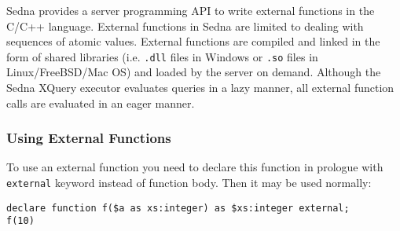 \documentclass[a4paper,12pt]{article}
\begin{document}
Sedna provides a server programming API to write external
functions in the C/C++ language.
External functions in Sedna are limited to dealing with sequences of atomic values.
External functions are compiled and linked in the form of shared
libraries (i.e. \verb!.dll! files in Windows or \verb!.so! files in Linux/FreeBSD/Mac OS)
and loaded by the server on demand.
Although the Sedna XQuery executor evaluates queries in a lazy manner, all external function calls are evaluated in an eager manner.

\subsubsection*{Using External Functions}
To use an external function you need to declare this function in prologue
with \verb!external! keyword instead of function body. Then it may be used
normally:
\begin{verbatim}
declare function f($a as xs:integer) as $xs:integer external;
f(10)
\end{verbatim}
\end{document}
